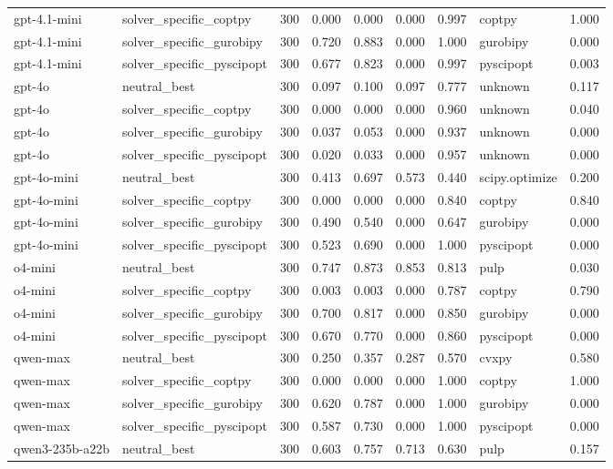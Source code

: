 \begin{table}[t]
\begin{tabular}{lllllllll}
gpt-4.1-mini & solver\_specific\_coptpy & 300 & 0.000 & 0.000 & 0.000 & 0.997 & coptpy & 1.000 \\
gpt-4.1-mini & solver\_specific\_gurobipy & 300 & 0.720 & 0.883 & 0.000 & 1.000 & gurobipy & 0.000 \\
gpt-4.1-mini & solver\_specific\_pyscipopt & 300 & 0.677 & 0.823 & 0.000 & 0.997 & pyscipopt & 0.003 \\
gpt-4o & neutral\_best & 300 & 0.097 & 0.100 & 0.097 & 0.777 & unknown & 0.117 \\
gpt-4o & solver\_specific\_coptpy & 300 & 0.000 & 0.000 & 0.000 & 0.960 & unknown & 0.040 \\
gpt-4o & solver\_specific\_gurobipy & 300 & 0.037 & 0.053 & 0.000 & 0.937 & unknown & 0.000 \\
gpt-4o & solver\_specific\_pyscipopt & 300 & 0.020 & 0.033 & 0.000 & 0.957 & unknown & 0.000 \\
gpt-4o-mini & neutral\_best & 300 & 0.413 & 0.697 & 0.573 & 0.440 & scipy.optimize & 0.200 \\
gpt-4o-mini & solver\_specific\_coptpy & 300 & 0.000 & 0.000 & 0.000 & 0.840 & coptpy & 0.840 \\
gpt-4o-mini & solver\_specific\_gurobipy & 300 & 0.490 & 0.540 & 0.000 & 0.647 & gurobipy & 0.000 \\
gpt-4o-mini & solver\_specific\_pyscipopt & 300 & 0.523 & 0.690 & 0.000 & 1.000 & pyscipopt & 0.000 \\
o4-mini & neutral\_best & 300 & 0.747 & 0.873 & 0.853 & 0.813 & pulp & 0.030 \\
o4-mini & solver\_specific\_coptpy & 300 & 0.003 & 0.003 & 0.000 & 0.787 & coptpy & 0.790 \\
o4-mini & solver\_specific\_gurobipy & 300 & 0.700 & 0.817 & 0.000 & 0.850 & gurobipy & 0.000 \\
o4-mini & solver\_specific\_pyscipopt & 300 & 0.670 & 0.770 & 0.000 & 0.860 & pyscipopt & 0.000 \\
qwen-max & neutral\_best & 300 & 0.250 & 0.357 & 0.287 & 0.570 & cvxpy & 0.580 \\
qwen-max & solver\_specific\_coptpy & 300 & 0.000 & 0.000 & 0.000 & 1.000 & coptpy & 1.000 \\
qwen-max & solver\_specific\_gurobipy & 300 & 0.620 & 0.787 & 0.000 & 1.000 & gurobipy & 0.000 \\
qwen-max & solver\_specific\_pyscipopt & 300 & 0.587 & 0.730 & 0.000 & 1.000 & pyscipopt & 0.000 \\
qwen3-235b-a22b & neutral\_best & 300 & 0.603 & 0.757 & 0.713 & 0.630 & pulp & 0.157 \\

\end{tabular}
\end{table}
